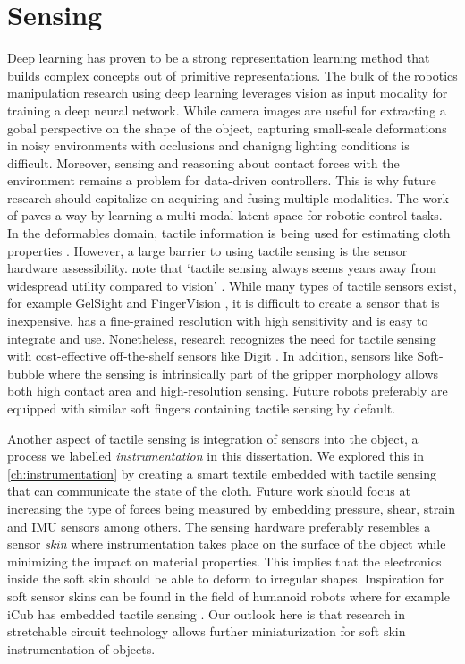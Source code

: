 \documentclass[\home/main.tex]{subfiles}
\begin{document}
\section{Sensing}
Deep learning has proven to be a strong representation learning method that builds complex concepts out of primitive representations. The bulk of the robotics manipulation research using deep learning leverages vision as input modality for training a deep neural network. While camera images are useful for extracting a gobal perspective on the shape of the object, capturing small-scale deformations in noisy environments with occlusions and chanigng lighting conditions is difficult. Moreover, sensing and reasoning about contact forces with the environment remains a problem for data-driven controllers. This is why future research should capitalize on acquiring and fusing multiple modalities. The work of \autocite{lee2020making} paves a way by learning a multi-modal latent space for robotic control tasks. In the deformables domain, tactile information is being used for estimating cloth properties \autocite{yuan2018active}. However, a large barrier to using tactile sensing is the sensor hardware assessibility. \citeauthor{Siciliano2008} note that `tactile sensing always seems years away from widespread utility compared to vision' \autocite{Siciliano2008}. While many types of tactile sensors exist, for example GelSight \autocite{donlon2018gelslim} and FingerVision \autocite{Yamaguchi2017}, it is difficult to create a sensor that is inexpensive, has a fine-grained resolution with high sensitivity and is easy to integrate and use. Nonetheless, research recognizes the need for tactile sensing with cost-effective off-the-shelf sensors like Digit \autocite{digit2020}. In addition, sensors like Soft-bubble \autocite{Alspach2019} where the sensing is intrinsically part of the gripper morphology allows both high contact area and high-resolution sensing. Future robots preferably are equipped with similar soft fingers containing tactile sensing by default. 

Another aspect of tactile sensing is integration of sensors into the object, a process we labelled \textit{instrumentation} in this dissertation. 
We explored this in \cref{ch:instrumentation} by creating a smart textile embedded with tactile sensing that can communicate the state of the cloth. Future work should focus at increasing the type of forces being measured by embedding pressure, shear, strain and IMU sensors among others. The sensing hardware preferably resembles a sensor \emph{skin} where instrumentation takes place on the surface of the object while minimizing the impact on material properties. This implies that the electronics inside the soft skin should be able to deform to irregular shapes. Inspiration for soft sensor skins can be found in the field of humanoid robots where for example iCub has embedded tactile sensing \autocite{Tomo2018}. Our outlook here is that research in stretchable circuit technology allows further miniaturization for soft skin instrumentation of objects.
\end{document}

